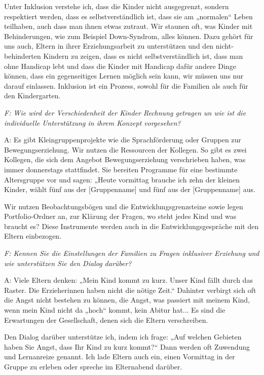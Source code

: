 \begin{linenumbers*}
Unter Inklusion verstehe ich, dass die Kinder nicht ausgegrenzt, sondern respektiert werden, dass es selbstverständlich ist, dass sie am „normalen“ Leben teilhaben, auch dass man ihnen etwas zutraut. Wir staunen oft, was Kinder mit Behinderungen, wie zum Beispiel Down-Syndrom, alles können. 
Dazu gehört für uns auch, Eltern in ihrer Erziehungsarbeit zu unterstützen und den nicht-behinderten Kindern zu zeigen, dass es nicht selbstverständlich ist, dass man ohne Handicap lebt und dass die Kinder mit Handicap dafür andere Dinge können, dass ein gegenseitiges Lernen möglich sein kann, wir müssen uns nur darauf einlassen. Inklusion ist ein Prozess, sowohl für die Familien als auch für den Kindergarten. 

\emph{F: Wie wird der Verschiedenheit der Kinder Rechnung getragen un wie ist die individuelle Unterstützung in ihrem Konzept vorgesehen?}

A: Es gibt Kleingruppenprojekte wie die Sprachförderung oder Gruppen zur Bewegungserziehung.
Wir nutzen die Ressourcen der Kollegen. So gibt es zwei Kollegen, die sich dem Angebot Bewegungserziehung verschrieben haben, was immer donnerstags stattfindet. Sie bereiten Programme für eine bestimmte Altersgruppe vor und sagen: „Heute vormittag brauche ich zehn der kleinen Kinder, wählt fünf aus der {[Gruppenname]} und fünf aus der {[Gruppenname]} aus. 
  
Wir nutzen Beobachtungsbögen und die Entwicklungsgrenzsteine sowie legen Portfolio-Ordner an, zur Klärung der Fragen, wo steht jedes Kind und was braucht es? Diese Instrumente werden auch in die Entwicklungsgespräche mit den Eltern einbezogen. 

\emph{F: Kennen Sie die Einstellungen der Familien zu Fragen inklusiver Erziehung und wie unterstützen Sie den Dialog darüber?}

A: Viele Eltern denken: „Mein Kind kommt zu kurz. Unser Kind fällt durch das Raster. Die Erzieherinnen haben nicht die nötige Zeit.“ Dahinter verbirgt sich oft die Angst nicht bestehen zu können, die Angst, was passiert mit meinem Kind, wenn mein Kind nicht da „hoch“ kommt, kein Abitur hat... Es sind die Erwartungen der Gesellschaft, denen sich die Eltern verschreiben.  

Den Dialog darüber unterstütze ich, indem ich frage: „Auf welchen Gebieten haben Sie Angst, dass Ihr Kind zu kurz kommt?“ Dann werden oft Zuwendung und Lernanreize genannt. Ich lade Eltern auch ein, einen Vormittag in der Gruppe zu erleben oder spreche im Elternabend darüber.  


\end{linenumbers*}
